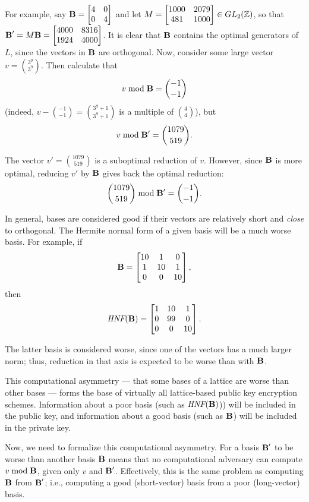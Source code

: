 For example, say $\textbf{B} = \begin{bmatrix} 4 & 0 \\ 0 & 4 \end{bmatrix}$ and let $M = \begin{bmatrix} 1000 & 2079 \\ 481 & 1000 \end{bmatrix} \in GL_2(\mathbb{Z})$, so that $\textbf{B}' = M \textbf{B} = \begin{bmatrix} 4000 & 8316 \\ 1924 & 4000 \end{bmatrix}$. It is clear that $\textbf{B}$ contains the optimal generators of $L$, since the vectors in $\textbf{B}$ are orthogonal. Now, consider some large vector $v = \binom{3^9}{3^9}$. Then calculate that
\[v \bmod \textbf{B} = \binom{-1}{-1}\]
(indeed, $v - \binom{-1}{-1} = \binom{3^9 + 1}{3^9 + 1}$ is a multiple of $\binom{4}{4}$), but
\[v \bmod \textbf{B}' = \binom{1079}{519}.\]

The vector $v' = \binom{1079}{519}$ is a suboptimal reduction of $v$. However, since $\textbf{B}$ is more optimal, reducing $v'$ by $\textbf{B}$ gives back the optimal reduction:
\[\binom{1079}{519} \bmod \textbf{B}' = \binom{-1}{-1}.\]

In general, bases are considered good if their vectors are relatively short and \emph{close} to orthogonal. The Hermite normal form of a given basis will be a much worse basis. For example, if
\[\textbf{B} = \begin{bmatrix} 10 & 1 & 0 \\ 1 & 10 & 1 \\ 0 & 0 & 10 \end{bmatrix},\]
then
\[\textit{HNF}(\textbf{B}) = \begin{bmatrix} 1 & 10 & 1 \\ 0 & 99 & 0 \\ 0 & 0 & 10 \end{bmatrix}.\]

The latter basis is considered worse, since one of the vectors has a much larger norm; thus, reduction in that axis is expected to be worse than with $\textbf{B}$.

This computational asymmetry --- that some bases of a lattice are worse than other bases --- forms the base of virtually all lattice-based public key encryption schemes. Information about a poor basis (such as $\textit{HNF}(\textbf{B})$)) will be included in the public key, and information about a good basis (such as $\textbf{B}$) will be included in the private key.

Now, we need to formalize this computational asymmetry. For a basis $\textbf{B}'$ to be worse than another basis $\textbf{B}$ means that no computational adversary can compute $v \bmod \textbf{B}$, given only $v$ and $\textbf{B}'$. Effectively, this is the same problem as computing $\textbf{B}$ from $\textbf{B}'$; i.e., computing a good (short-vector) basis from a poor (long-vector) basis.

